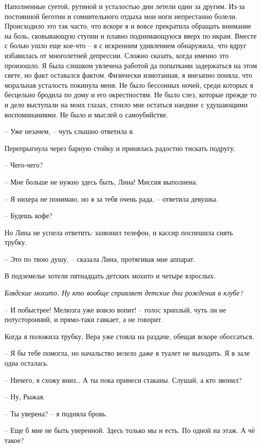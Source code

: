 \documentclass[
]{book}
\begin{document}
Наполненные суетой, рутиной и усталостью дни летели один за другим. Из-за постоянной беготни и сомнительного отдыха мои ноги непрестанно болели. Происходило это так часто, что вскоре я и вовсе прекратила обращать внимание на боль, сковывающую ступни и плавно поднимающуюся вверх по икрам. Вместе с болью ушло еще кое-что -- я с искренним удивлением обнаружила, что вдруг избавилась от многолетней депрессии. Сложно сказать, когда именно это произошло. Я была слишком увлечена работой да попытками задержаться на этом свете, но факт оставался фактом. Физически измотанная, я внезапно поняла, что моральная усталость покинула меня. Не было бессонных ночей, среди которых я бесцельно бродила по дому и его окрестностям. Не было слез, которые прежде то и дело выступали на моих глазах, стоило мне остаться наедине с удушающими воспоминаниями. Не было и мыслей о самоубийстве.

-- Уже незачем, -- чуть слышно ответила я.

Перепрыгнула через барную стойку и принялась радостно тискать подругу.

-- Чего-чего?

-- Мне больше не нужно здесь быть, Лина! Миссия выполнена.

-- Я нихера не понимаю, но я за тебя очень рада, -- ответила девушка.

-- Будешь кофе?

Но Лина не успела ответить: зазвонил телефон, и кассир поспешила снять трубку.

-- Это по твою душу, -- сказала Лина, протягивая мне аппарат.

В подземелье хотели пятнадцать детских мохито и четыре взрослых.

\emph{Блядские мохито. Ну кто вообще справляет детские дни рождения в клубе?}

-- И побыстрее! Мелюзга уже вовсю вопит! -- голос хриплый, чуть ли не потусторонний, и прямо-таки гавкает, а не говорит.

Когда я положила трубку, Вера уже стояла на раздаче, обещая вскоре обоссаться.

-- Я бы тебе помогла, но начальство велело даже в туалет не выходить. Я в зале одна осталась.

-- Ничего, я схожу вниз\ldots{} А ты пока принеси стаканы. Слушай, а кто звонил?

-- Ну, Рыжая.

-- Ты уверена? -- я подняла бровь.

-- Еще б мне не быть уверенной. Здесь только мы и есть. По одной на этаж. А чё такое?
\end{document}
